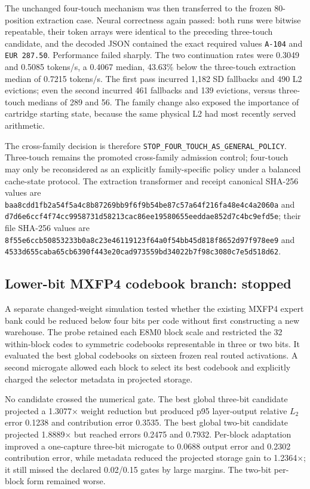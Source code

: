 The unchanged four-touch mechanism was then transferred to the frozen
80-position extraction case.  Neural correctness again passed: both runs were
bitwise repeatable, their token arrays were identical to the preceding
three-touch candidate, and the decoded JSON contained the exact required
values \texttt{A-104} and \texttt{EUR 287.50}.  Performance failed sharply.
The two continuation rates were 0.3049 and 0.5085 tokens/s, a 0.4067 median,
43.63\% below the three-touch extraction median of 0.7215 tokens/s.  The first
pass incurred 1,182 SD fallbacks and 490 L2 evictions; even the second incurred
461 fallbacks and 139 evictions, versus three-touch medians of 289 and 56.
The family change also exposed the importance of cartridge starting state,
because the same physical L2 had most recently served arithmetic.

The cross-family decision is therefore
\texttt{STOP\_FOUR\_TOUCH\_AS\_GENERAL\_POLICY}.  Three-touch remains the
promoted cross-family admission control; four-touch may only be reconsidered as
an explicitly family-specific policy under a balanced cache-state protocol.
The extraction transformer and receipt canonical SHA-256 values are
\texttt{baa8cdd1fb2a54f5a4c8b87269bb9f6f9b54be87c57a64f216fa48e4c4a2060a}
and
\texttt{d7d6e6ccf4f74cc9958731d58213cac86ee19580655eeddae852d7c4bc9efd5e};
their file SHA-256 values are
\texttt{8f55e6ccb50853233b0a8c23e46119123f64a0f54bb45d818f8652d97f978ee9}
and
\texttt{4533d655caba65cb6390f443e20cad973559bd34022b7f98c3080c7e5d518d62}.

\subsection{Lower-bit MXFP4 codebook branch: stopped}

A separate changed-weight simulation tested whether the existing MXFP4 expert
bank could be reduced below four bits per code without first constructing a
new warehouse.  The probe retained each E8M0 block scale and restricted the
32 within-block codes to symmetric codebooks representable in three or two
bits.  It evaluated the best global codebooks on sixteen frozen real routed
activations.  A second microgate allowed each block to select its best codebook
and explicitly charged the selector metadata in projected storage.

No candidate crossed the numerical gate.  The best global three-bit candidate
projected a 1.3077$\times$ weight reduction but produced p95 layer-output
relative $L_2$ error 0.1238 and contribution error 0.3535.  The best global
two-bit candidate projected 1.8889$\times$ but reached errors 0.2475 and
0.7932.  Per-block adaptation improved a one-capture three-bit microgate to
0.0688 output error and 0.2302 contribution error, while metadata reduced the
projected storage gain to 1.2364$\times$; it still missed the declared
0.02/0.15 gates by large margins.  The two-bit per-block form remained worse.

